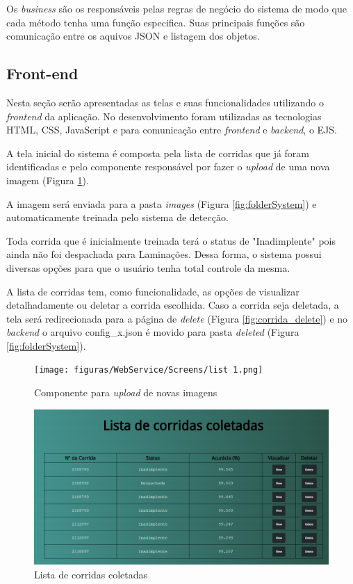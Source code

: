 Os \textit{business} são os responsáveis pelas regras de negócio do sistema de modo que cada método tenha uma função especifica. Suas principais funções são comunicação entre os aquivos JSON e listagem dos objetos.

\subsection{Front-end}

Nesta seção serão apresentadas as telas e suas funcionalidades utilizando o \textit{frontend} da aplicação. No desenvolvimento foram utilizadas as tecnologias HTML, CSS, JavaScript e para comunicação entre \textit{frontend} e \textit{backend}, o EJS.

A tela inicial do sistema é composta pela lista de corridas que já foram identificadas e pelo componente responsável por fazer o \textit{upload} de uma nova imagem (Figura \ref{fig:list1}).

A imagem será enviada para a pasta \textit{images} (Figura \ref{fig:folderSystem}) e automaticamente treinada pelo sistema de detecção.

Toda corrida que é inicialmente treinada terá o status de "Inadimplente" pois ainda não foi despachada para Laminações. Dessa forma, o sistema possui diversas opções para que o usuário tenha total controle da mesma.

A lista de corridas tem, como funcionalidade, as opções de visualizar detalhadamente ou deletar a corrida escolhida. Caso a corrida seja deletada, a tela será redirecionada para a página de \textit{delete} (Figura \ref{fig:corrida_delete}) e no \textit{backend} o arquivo config\_x.json é movido para pasta \textit{deleted} (Figura \ref{fig:folderSystem}).

\begin{figure}[H]
	\centering
	\texttt{[image: figuras/WebService/Screens/list  1.png]}
	\caption{Componente para \textit{upload} de novas imagens}
	\label{fig:list1}
\end{figure}

\begin{figure}[H]
	\centering
	\includegraphics[width=1\linewidth]{figuras/WebService/Screens/list 2.png}
	\caption{Lista de corridas coletadas}
	\label{fig:list2}
\end{figure}

